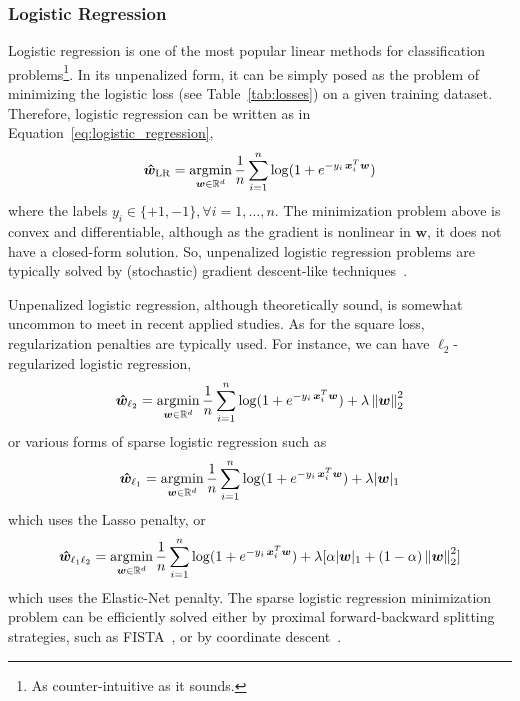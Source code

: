 			\subsubsection{Logistic Regression} \label{sec:logistic_regression}
			Logistic regression is one of the most popular linear methods for classification problems\footnote{ As counter-intuitive as it sounds.}. In its unpenalized form, it can be simply posed as the problem of minimizing the logistic loss (see Table~\ref{tab:losses}) on a given training dataset. Therefore, logistic regression can be written as in Equation~\eqref{eq:logistic_regression},
			\begin{equation} \label{eq:logistic_regression}
				\bm{\hat w}_{\text{LR}} = \mathop{\mathrm{argmin}}\limits_{\bm{w} \in \mathbb{R}^d} \frac{1}{n}\sum_{i=1}^n\log(1 + e^{-y_i\,\bm{x}_i^T\bm{w}})
			\end{equation}
			where the labels $y_i \in \{+1,-1\}, \forall i=1,\dots,n$. The minimization problem above is convex and differentiable, although as the gradient is nonlinear in $\bm{w}$, it does not have a closed-form solution. So, unpenalized logistic regression problems are typically solved by (stochastic) gradient descent-like techniques~\cite{boyd2004convex, sra2012optimization}.

			Unpenalized logistic regression, although theoretically sound, is somewhat uncommon to meet in recent applied studies. As for the square loss, regularization penalties are typically used. For instance, we can have $\ell_2$-regularized logistic regression,
			\begin{equation} \label{eq:logistic_l2}
				\bm{\hat w}_{\ell_2} = \mathop{\mathrm{argmin}}\limits_{\bm{w} \in \mathbb{R}^d} \frac{1}{n}\sum_{i=1}^n\log(1 + e^{-y_i\,\bm{x}_i^T\bm{w}}) + \lambda \left\lVert\bm{w}\right\rVert_2^2
		  \end{equation}
			or various forms of sparse logistic regression such as
			\begin{equation} \label{eq:logistic_l1}
				\bm{\hat w}_{\ell_1} = \mathop{\mathrm{argmin}}\limits_{\bm{w} \in \mathbb{R}^d} \frac{1}{n}\sum_{i=1}^n\log(1 + e^{-y_i\,\bm{x}_i^T\bm{w}}) + \lambda |\bm{w}|_1
		  \end{equation}
			which uses the Lasso penalty, or
			\begin{equation} \label{eq:logistic_l1l2}
				\bm{\hat w}_{\ell_1\ell_2} = \mathop{\mathrm{argmin}}\limits_{\bm{w} \in \mathbb{R}^d} \frac{1}{n}\sum_{i=1}^n\log(1 + e^{-y_i\,\bm{x}_i^T\bm{w}}) + \lambda [\alpha |\bm{w}|_1 + (1-\alpha) \left\lVert\bm{w}\right\rVert_2^2]
		  \end{equation}
			which uses the Elastic-Net penalty.
      The sparse logistic regression minimization problem can be efficiently solved either by proximal forward-backward splitting strategies, such as FISTA~\cite{beck2009fast}, or by coordinate descent~\cite{wu2008coordinate}.

